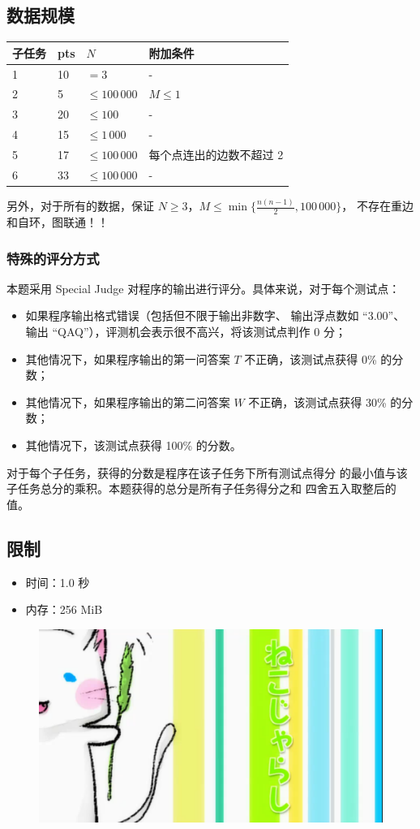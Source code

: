 \documentclass[UTF8, 11pt, a4paper]{article}
\begin{document}
\subsection*{数据规模}
\begin{table}[h]\centering
\begin{tabularx}{0.8 \textwidth}{X|X|X|X}
子任务 & pts & $N$             & 附加条件 \\ \hline\hline
1      & 10  & $= 3$           & - \\ \hline
2      & 5   & $\leq 100\,000$ & $M \leq 1$ \\ \hline
3      & 20  & $\leq 100$      & - \\ \hline
4      & 15  & $\leq 1\,000$   & - \\ \hline
5      & 17  & $\leq 100\,000$ & 每个点连出的边数不超过 2 \\ \hline
6      & 33  & $\leq 100\,000$ & - \\
\end{tabularx}\end{table}
另外，对于所有的数据，保证 $N \geq 3$，$M \leq \min\{\frac{n(n-1)}{2}, 100\,000\}$，%
不存在重边和自环，图联通！！

\subsubsection*{特殊的评分方式}
本题采用 Special Judge 对程序的输出进行评分。具体来说，对于每个测试点：
\begin{itemize}
    \item 如果程序输出格式错误（包括但不限于输出非数字、%
        输出浮点数如 “3.00”、输出 “QAQ”），评测机会表示很不高兴，将该测试点判作 0 分；
    \item 其他情况下，如果程序输出的第一问答案 $T$ 不正确，该测试点获得 0\% 的分数；
    \item 其他情况下，如果程序输出的第二问答案 $W$ 不正确，该测试点获得 30\% 的分数；
    \item 其他情况下，该测试点获得 100\% 的分数。
\end{itemize}
对于每个子任务，获得的分数是程序在该子任务下所有测试点得分%
的最小值与该子任务总分的乘积。本题获得的总分是所有子任务得分之和%
四舍五入取整后的值。

\subsection*{限制}
\begin{itemize}
\item 时间：1.0 秒
\item 内存：256 MiB
\end{itemize}

\begin{figure}[h]\centering
\includegraphics[width=0.6 \textwidth]{nekojyarashi.png}
\end{figure}
\end{document}
